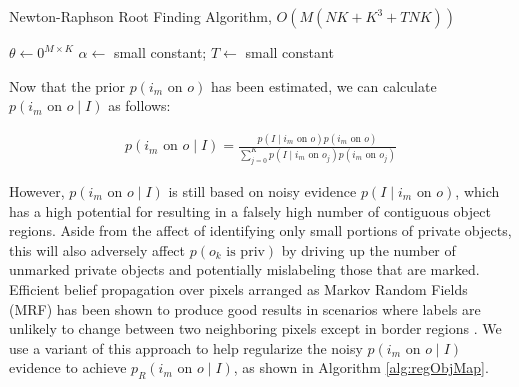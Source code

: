 \documentclass[11pt]{article}
\begin{document}
\begin{algorithm}[htp!]\label{alg:newtraph}
\caption{Newton-Raphson Root Finding Algorithm, $O(M(NK + K^3 + TNK))$}
	$\theta \leftarrow 0^{M \times K}$\;
	$\alpha \leftarrow$ small constant; $T \leftarrow$ small constant\;
\end{algorithm}

Now that the prior $p(i_m \textrm{ on } o)$ has been estimated, we can calculate $p(i_m \textrm{ on } o \mid I)$ as follows:

\begin{align}
    p(i_m \textrm{ on } o \mid I) = 
	    \frac{p(I \mid i_m \textrm{ on } o) p(i_m \textrm{ on } o)}{\sum_{j=0}^{K} p(I \mid i_m \textrm{ on } o_j) p(i_m \textrm{ on } o_j)}    
\end{align}

However, $p(i_m \textrm{ on } o \mid I)$ is still based on noisy evidence $p(I \mid i_m \textrm{ on } o)$, which has a high potential for resulting in a falsely high number of contiguous object regions.  Aside from the affect of identifying only small portions of private objects, this will also adversely affect $p(o_k \textrm{ is priv})$ by driving up the number of unmarked private objects and potentially mislabeling those that are marked.  Efficient belief propagation over pixels arranged as Markov Random Fields (MRF) has been shown to produce good results in scenarios where labels are unlikely to change between two neighboring pixels except in border regions \cite{felzenszwalb2006efficient}.  We use a variant of this approach to help regularize the noisy $p(i_m \textrm{ on } o \mid I)$ evidence to achieve $p_R(i_m \textrm{ on } o \mid I)$, as shown in Algorithm \ref{alg:regObjMap}.
\end{document}
